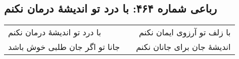 \begin{center}
\section*{رباعی شماره ۴۶۴: با درد تو اندیشهٔ درمان نکنم}
\label{sec:sh464}
\begin{longtable}{l p{0.5cm} r}
با درد تو اندیشهٔ درمان نکنم
&&
با زلف تو آرزوی ایمان نکنم
\\
جانا تو اگر جان طلبی خوش باشد
&&
اندیشهٔ جان برای جانان نکنم
\\
\end{longtable}
\end{center}
